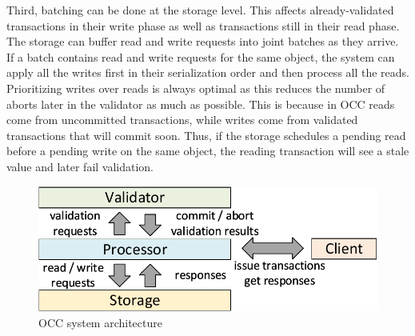 Third, batching can be done at the storage level. This affects
already-validated transactions in their write phase as well as transactions
still in their read phase. The storage can buffer read and write requests into
joint batches as they arrive. If a batch contains read and write requests for
the same object, the system can apply all the writes first in their serialization
order and then process all the reads. Prioritizing writes over reads is always
optimal as this reduces the number of aborts later in the validator as much as possible. This is
because in OCC reads come from uncommitted transactions, while writes come from
validated transactions that will commit soon. Thus, if the storage schedules a
pending read before a pending write on the same object, the reading transaction
will see a stale value and later fail validation. 


\begin{figure}[t]
	\centering
	\includegraphics[width=0.8\columnwidth]{figures/arch.pdf}
	\caption{OCC system architecture}
	\label{fig:occ_arch}
\end{figure}


